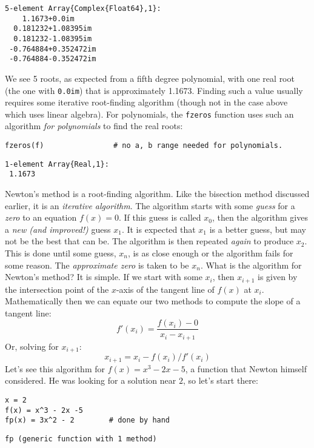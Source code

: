 \documentclass[12pt]{article}
\begin{document}
\begin{verbatim}
5-element Array{Complex{Float64},1}:
    1.1673+0.0im     
  0.181232+1.08395im 
  0.181232-1.08395im 
 -0.764884+0.352472im
 -0.764884-0.352472im\end{verbatim}
\newline
We see 5 roots, as expected from a fifth degree polynomial, with one real root (the one with \texttt{0.0im}) that is approximately 1.1673. Finding such a value usually requires some iterative root-finding algorithm (though not in the case above which uses linear algebra). For polynomials, the \texttt{fzeros} function uses such an algorithm \textit{for polynomials} to find the real roots:\begin{verbatim}
fzeros(f)                # no a, b range needed for polynomials.
\end{verbatim}
\begin{verbatim}
1-element Array{Real,1}:
 1.1673\end{verbatim}
\newline
Newton's method is a root-finding algorithm.  Like the bisection method discussed earlier, it is an \textit{iterative algorithm}. The algorithm starts with some \textit{guess} for a \textit{zero} to an equation $f(x)=0$. If this guess is called $x_0$, then the algorithm gives a \textit{new (and improved!)} guess $x_1$. It is expected that $x_1$ is a better guess, but may not be the best that can be. The algorithm is then repeated \textit{again} to produce $x_2$. This is done until some guess, $x_n$, is as close enough or the algorithm fails for some reason. The \textit{approximate zero} is taken to be $x_n$.\newline
What is the algorithm for Newton's method? It is simple. If we start with some $x_i$, then $x_{i+1}$ is given by the intersection point of the $x$-axis of the tangent line of $f(x)$ at $x_i$. Mathematically then we can equate our two methods to compute the slope of a tangent line:
$$
f'(x_i) = \frac{f(x_i) - 0}{x_i - x_{i+1}}
$$
\newline
Or, solving for $x_{i+1}$:
$$
x_{i+1} = x_i - f(x_i)/f'(x_i)
$$
\newline
Let's see this algorithm for $f(x) = x^3−2x−5$, a function that Newton himself considered. He was looking for a solution near $2$, so let's start there:\begin{verbatim}
x = 2
f(x) = x^3 - 2x -5
fp(x) = 3x^2 - 2		# done by hand
\end{verbatim}
\begin{verbatim}
fp (generic function with 1 method)\end{verbatim}
\end{document}
